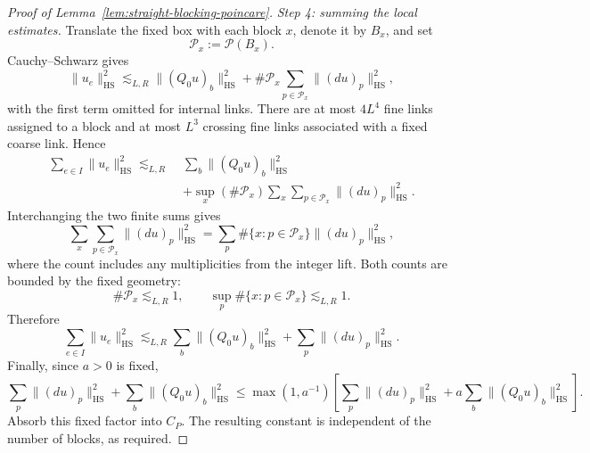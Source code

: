 \documentclass[10pt,reqno]{amsart}
\theoremstyle{definition}
\theoremstyle{remark}
\numberwithin{equation}{section}
\numberwithin{figure}{section}
\begin{document}
\begin{proof}[Proof of Lemma~\ref{lem:straight-blocking-poincare}]
\emph{Step 4: summing the local estimates.}
Translate the fixed box with each block $x$, denote it by $B_x$, and set
\begin{equation}\label{eq:poincare-translated-plaquettes}
\mathcal P_x:=\mathcal P(B_x).
\end{equation}
Cauchy--Schwarz gives
\begin{equation}\label{eq:poincare-squared-link-bound}
\|u_e\|_{\mathrm{HS}}^2\lesssim_{L,R}
\|(Q_0u)_b\|_{\mathrm{HS}}^2
+\#\mathcal P_x\sum_{p\in\mathcal P_x}\|(du)_p\|_{\mathrm{HS}}^2,
\end{equation}
with the first term omitted for internal links. There are at most $4L^4$
fine links assigned to a block and at most $L^3$ crossing fine links
associated with a fixed coarse link. Hence
\begin{equation}\label{eq:poincare-summed-local-bound}
\begin{aligned}
\sum_{e\in I}\|u_e\|_{\mathrm{HS}}^2\lesssim_{L,R}\;&
\sum_b\|(Q_0u)_b\|_{\mathrm{HS}}^2\\
&+\sup_x(\#\mathcal P_x)
\sum_x\sum_{p\in\mathcal P_x}\|(du)_p\|_{\mathrm{HS}}^2.
\end{aligned}
\end{equation}
Interchanging the two finite sums gives
\begin{equation}\label{eq:poincare-overlap-identity}
\sum_x\sum_{p\in\mathcal P_x}\|(du)_p\|_{\mathrm{HS}}^2
=\sum_p\#\{x:p\in\mathcal P_x\}\|(du)_p\|_{\mathrm{HS}}^2,
\end{equation}
where the count includes any multiplicities from the integer lift.
Both counts are bounded by the fixed geometry:
\begin{equation}\label{eq:poincare-overlap-bounds}
\#\mathcal P_x\lesssim_{L,R}1,\qquad
\sup_p\#\{x:p\in\mathcal P_x\}\lesssim_{L,R}1.
\end{equation}
Therefore
\begin{equation}\label{eq:poincare-unweighted-conclusion}
\boxed{\sum_{e\in I}\|u_e\|_{\mathrm{HS}}^2
\lesssim_{L,R}\sum_b\|(Q_0u)_b\|_{\mathrm{HS}}^2
+\sum_p\|(du)_p\|_{\mathrm{HS}}^2.}
\end{equation}
Finally, since $a>0$ is fixed,
\begin{equation}\label{eq:poincare-weighted-conclusion}
\sum_p\|(du)_p\|_{\mathrm{HS}}^2+\sum_b\|(Q_0u)_b\|_{\mathrm{HS}}^2
\le\max(1,a^{-1})\left[
\sum_p\|(du)_p\|_{\mathrm{HS}}^2+a\sum_b\|(Q_0u)_b\|_{\mathrm{HS}}^2\right].
\end{equation}
Absorb this fixed factor into $C_P$. The resulting constant is independent
of the number of blocks, as required.
\end{proof}
\end{document}
